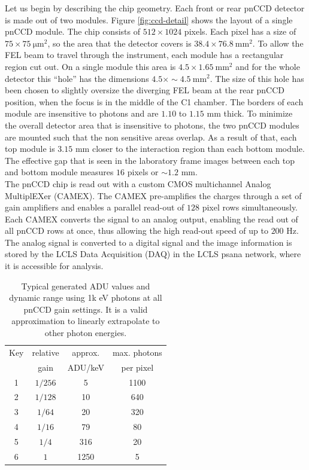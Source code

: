 Let us begin by describing the chip geometry. Each front or rear pnCCD detector is made out of two modules. Figure \ref{fig:ccd-detail} shows the layout of a single pnCCD module. The chip consists of $512 \times 1024$ pixels. Each pixel has a size of $75 \times \SI{75}{\micro\meter\squared}$, so the area that the detector covers is $38.4 \times \SI{76.8}{\milli\meter\squared}$. To allow the FEL beam to travel through the instrument, each module has a rectangular region cut out. On a single module this area is $4.5 \times \SI{1.65}{\milli\meter\squared}$ and for the whole detector this ``hole'' has the dimensions $4.5 \times \sim\SI{4.5}{\milli\meter\squared}$. The size of this hole has been chosen to slightly oversize the diverging FEL beam at the rear pnCCD position, when the focus is in the middle of the C1 chamber. The borders of each module are insensitive to photons and are $1.10$ to $1.15$ mm thick. To minimize the overall detector area that is insensitive to photons, the two pnCCD modules are mounted such that the non sensitive areas overlap. As a result of that, each top module is $3.15$ mm closer to the interaction region than each bottom module. The effective gap that is seen in the laboratory frame images between each top and bottom module measures $16$ pixels or $\sim 1.2$ mm.\\[1\baselineskip]
%
The pnCCD chip is read out with a custom CMOS multichannel Analog MultiplEXer (CAMEX). The CAMEX pre-amplifies the charges through a set of gain amplifiers and enables a parallel read-out of $128$ pixel rows simultaneously. Each CAMEX converts the signal to an analog output, enabling the read out of all pnCCD rows at once, thus allowing the high read-out speed of up to $200$ Hz. The analog signal is converted to a digital signal and the image information is stored by the LCLS Data Acquisition (DAQ) in the LCLS psana network, where it is accessible for analysis.\\[1\baselineskip]
\begin{table}%
\centering
\begin{tabular}{ |c c c c |}
 \hline
 Key & relative  & approx.  & max. photons \\ 
     &   gain    & ADU/keV  & per pixel  \\
 \hline
 1 & $1/256$ & 5 & 1100  \\
 2 & $1/128$ & 10 & 640   \\
 3 & $1/64$ & 20 & 320   \\
 4 & $1/16$ & 79 & 80  \\
 5 & $1/4$ & 316 & 20  \\
 6 & $1$ & 1250 & 5  \\
 \hline
\end{tabular}
\caption[pnCCD gain modes and typical ADU values at 1k eV photons.]{Typical generated ADU values and dynamic range using 1k eV photons at all pnCCD gain settings. It is a valid approximation to linearly extrapolate to other photon energies.}
\label{tab:gain-modes}
\end{table}
